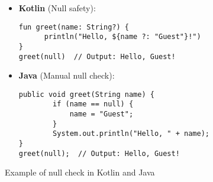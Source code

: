 \begin{figure}[H]
\centering
\begin{tcolorbox}[colframe=blue!80!black, colback=blue!5!white, coltitle=blue!50!black, title={-}, boxrule=0.5mm, width=0.8\textwidth, sharp corners=south]
    \begin{itemize}
    \vspace{0.2cm}
        \item \textbf{\scriptsize Kotlin} \scriptsize (Null safety):
        \begin{lstlisting}[style=kotlin, basicstyle=\tiny\ttfamily]
fun greet(name: String?) {
      println("Hello, ${name ?: "Guest"}!")
}
greet(null)  // Output: Hello, Guest!
        \end{lstlisting}
        
        \item \textbf{\scriptsize Java} \scriptsize (Manual null check):
        \begin{lstlisting}[style=java, basicstyle=\tiny\ttfamily]
public void greet(String name) {
        if (name == null) {
            name = "Guest";
        }
        System.out.println("Hello, " + name);
}
greet(null);  // Output: Hello, Guest!
        \end{lstlisting}
    \end{itemize}
\end{tcolorbox}
\caption{Example of null check in Kotlin and Java}
\label{fig:null_check}
\end{figure}

